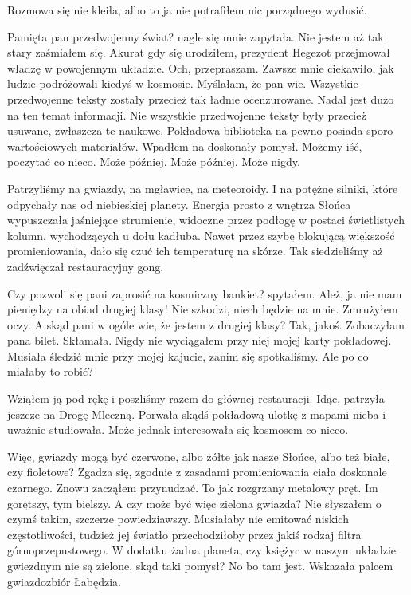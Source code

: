 Rozmowa się nie kleiła, albo to ja nie potrafiłem nic porządnego wydusić.

\begin{dialogue}
	\ds{} Pamięta pan przedwojenny świat? \dm{} nagle się mnie zapytała. 
	\ds{} Nie jestem aż tak stary \dm{} zaśmiałem się. \dm{} Akurat gdy się urodziłem, prezydent Hegezot przejmował władzę w powojennym układzie.
	\ds{} Och, przepraszam. Zawsze mnie ciekawiło, jak ludzie podróżowali kiedyś w kosmosie. Myślałam, że pan wie. Wszystkie przedwojenne teksty zostały przecież tak ładnie ocenzurowane.
	\ds{} Nadal jest dużo na ten temat informacji. Nie wszystkie przedwojenne teksty były przecież usuwane, zwłaszcza te naukowe. Pokładowa biblioteka na pewno posiada sporo wartościowych materiałów. \dm{} Wpadłem na doskonały pomysł. \dm{} Możemy iść, poczytać co nieco.
	\ds{} Może później.
	\ds{} Może później. \dm{} Może nigdy.
\end{dialogue}

Patrzyliśmy na gwiazdy, na mgławice, na meteoroidy. I na potężne silniki, które odpychały nas od niebieskiej planety.
Energia prosto z wnętrza Słońca wypuszczała jaśniejące strumienie, widoczne przez podłogę w postaci świetlistych kolumn, wychodzących u dołu kadłuba.
Nawet przez szybę blokującą większość promieniowania, dało się czuć ich temperaturę na skórze.
Tak siedzieliśmy aż zadźwięczał restauracyjny gong.

\begin{dialogue}
	\ds{} Czy pozwoli się pani zaprosić na kosmiczny bankiet? \dm{} spytałem.
	\ds{} Ależ, ja nie mam pieniędzy na obiad drugiej klasy!
	\ds{} Nie szkodzi, niech będzie na mnie. \dm{} Zmrużyłem oczy. \dm{} A skąd pani w ogóle wie, że jestem z drugiej klasy?
	\ds{} Tak, jakoś. Zobaczyłam pana bilet. \dm{} Skłamała. Nigdy nie wyciągałem przy niej mojej karty pokładowej. Musiała śledzić mnie przy mojej kajucie, zanim się spotkaliśmy. Ale po co miałaby to robić?
\end{dialogue}

Wziąłem ją pod rękę i poszliśmy razem do głównej restauracji.
Idąc, patrzyła jeszcze na Drogę Mleczną. Porwała skądś pokładową ulotkę z mapami nieba i uważnie studiowała.
Może jednak interesowała się kosmosem co nieco.

\begin{dialogue}
	\ds{} Więc, gwiazdy mogą być czerwone, albo żółte jak nasze Słońce, albo też białe, czy fioletowe?
	\ds{} Zgadza się, zgodnie z zasadami promieniowania ciała doskonale czarnego. \dm{} Znowu zacząłem przynudzać. \dm{} To jak rozgrzany metalowy pręt.
		Im gorętszy, tym bielszy.
	\ds{} A czy może być więc zielona gwiazda?
	\ds{} Nie słyszałem o czymś takim, szczerze powiedziawszy. Musiałaby nie emitować niskich częstotliwości, tudzież jej światło przechodziłoby przez jakiś rodzaj filtra górnoprzepustowego.
		W dodatku żadna planeta, czy księżyc w naszym układzie gwiezdnym nie są zielone, skąd taki pomysł?
	\ds{} No bo tam jest. \dm{} Wskazała palcem gwiazdozbiór Łabędzia.
\end{dialogue}

